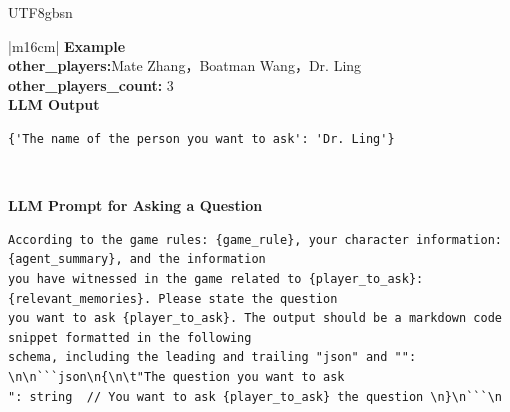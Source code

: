 \documentclass[11pt]{article}
\begin{document}
{\begin{CJK}{UTF8}{gbsn}
\begin{table}[ht!]
\begin{minipage}[t]{\linewidth}
\begin{tabular}{|m{16cm}|}
\hline
{}  \textbf{Example}  \\
 \textbf{  other\_players:}\small Mate Zhang，Boatman Wang，Dr. Ling\\
 \textbf{  other\_players\_count:} \small3\\
 
\hline
{}  \textbf{LLM Output}  \\
\hline
\begin{minipage}[t]{\linewidth}
\small\begin{verbatim}
{'The name of the person you want to ask': 'Dr. Ling'}

\end{verbatim}
\end{minipage} \\
\hline

\hline
{}  {\textbf{LLM Prompt for Asking a Question}} \\
\begin{minipage}[t]{\linewidth}
\small\begin{verbatim}
According to the game rules: {game_rule}, your character information: {agent_summary}, and the information
you have witnessed in the game related to {player_to_ask}: {relevant_memories}. Please state the question
you want to ask {player_to_ask}. The output should be a markdown code snippet formatted in the following
schema, including the leading and trailing "json" and "": \n\n```json\n{\n\t"The question you want to ask
": string  // You want to ask {player_to_ask} the question \n}\n```\n

\end{verbatim}
\end{minipage} \\
\hline


\end{tabular}
\end{minipage}
\end{table}
\end{CJK}}
\end{document}
